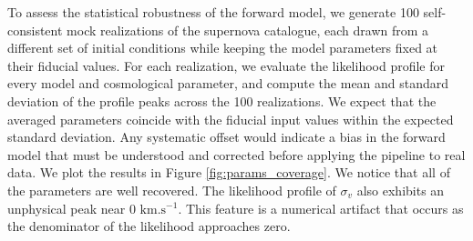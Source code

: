 To assess the statistical robustness of the forward model, we generate 100 self-consistent mock realizations of the supernova catalogue, each drawn from 
a different set of initial conditions while keeping the model parameters fixed at their fiducial values. For each realization, we evaluate the likelihood 
profile for every model and cosmological parameter, and compute the mean and standard deviation of the profile peaks across the 100 realizations. 
We expect that the averaged parameters coincide with the fiducial input values within the expected standard deviation. Any systematic offset would indicate a 
bias in the forward model that must be understood and corrected before applying the pipeline to real data. We plot the results in 
Figure \ref{fig:params_coverage}. We notice that all of the parameters are well 
recovered. 
The likelihood profile of $\sigma_v$ also exhibits an unphysical peak near 0 $\text{km}.\text{s}^{-1}$. 
This feature is a numerical artifact that occurs as the denominator of the likelihood approaches zero. 
\\



